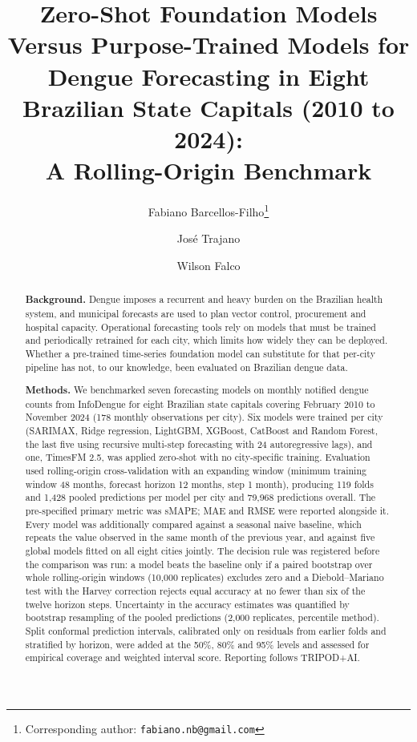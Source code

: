 \documentclass[11pt]{article}
\title{Zero-Shot Foundation Models Versus Purpose-Trained Models for Dengue
Forecasting in Eight Brazilian State Capitals (2010 to 2024):\\
A Rolling-Origin Benchmark}
\author{Fabiano Barcellos-Filho\thanks{Corresponding author:
\texttt{fabiano.nb@gmail.com}} \and Jos\'e Trajano \and Wilson Falco}
\date{}
\begin{document}
\maketitle



\begin{abstract}
\noindent\textbf{Background.} Dengue imposes a recurrent and heavy burden on the
Brazilian health system, and municipal forecasts are used to plan vector control,
procurement and hospital capacity. Operational forecasting tools rely on models that
must be trained and periodically retrained for each city, which limits how widely they
can be deployed. Whether a pre-trained time-series foundation model can substitute for
that per-city pipeline has not, to our knowledge, been evaluated on Brazilian dengue data.

\noindent\textbf{Methods.} We benchmarked seven forecasting models on monthly notified
dengue counts from InfoDengue for eight Brazilian state capitals covering February 2010
to November 2024 (178 monthly observations per city). Six models were trained per city
(SARIMAX, Ridge regression, LightGBM, XGBoost, CatBoost and Random Forest, the last five
using recursive multi-step forecasting with 24 autoregressive lags), and one, TimesFM
2.5, was applied zero-shot with no city-specific training. Evaluation used rolling-origin
cross-validation with an expanding window (minimum training window 48 months, forecast
horizon 12 months, step 1 month), producing 119 folds and 1{,}428 pooled predictions per
model per city and 79{,}968 predictions overall. The pre-specified primary metric was
sMAPE; MAE and RMSE were reported alongside it. Every model was additionally compared
against a seasonal naive baseline, which repeats the value observed in the same month of
the previous year, and against five global models fitted on all eight cities jointly. The
decision rule was registered before the comparison was run: a model beats the baseline
only if a paired bootstrap over whole rolling-origin windows (10{,}000 replicates)
excludes zero and a Diebold--Mariano test with the Harvey correction rejects equal
accuracy at no fewer than six of the twelve horizon steps. Uncertainty in the accuracy
estimates was quantified by bootstrap resampling of the pooled predictions (2{,}000
replicates, percentile method). Split conformal prediction intervals, calibrated only on residuals
from earlier folds and stratified by horizon, were added at the 50\%, 80\% and 95\%
levels and assessed for empirical coverage and weighted interval score. Reporting follows
TRIPOD+AI.


\end{abstract}
\end{document}
